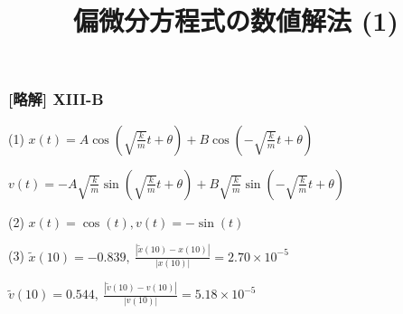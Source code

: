 \documentclass[dvipdfmx,aspectratio=169,20pt]{beamer}
\newcommand{\myfontsetting}[3]{{\fontsize{#1}{#2}\selectfont #3}}
\begin{document}
\begin{frame}
\frametitle{[略解] X\hspace{-.1em}I\hspace{-.1em}I\hspace{-.1em}I-B}
\myfontsetting{16pt}{16pt}{
(1) $x(t) = A \cos\left( \sqrt{\frac{k}{m}} t + \theta \right) + B \cos\left( - \sqrt{\frac{k}{m}} t + \theta \right) $

\hspace{8mm} $v(t) = - A \sqrt{\frac{k}{m}}\sin\left( \sqrt{\frac{k}{m}} t + \theta \right) + B \sqrt{\frac{k}{m}}\sin\left( - \sqrt{\frac{k}{m}} t + \theta \right) $

\vspace{5mm}

(2) $x(t) = \cos(t), v(t) = - \sin(t)$

\vspace{5mm}

(3) $\tilde{x}(10) = -0.839,\  \frac{|\tilde{x}(10) - x(10)|}{|x(10)|} = 2.70 \times 10^{-5}$

\hspace{8mm} $\tilde{v}(10) = 0.544,\  \frac{|\tilde{v}(10) - v(10)|}{|v(10)|} = 5.18 \times 10^{-5}$
}

\end{frame}

\title{\myfontsetting{32pt}{32pt}{偏微分方程式の数値解法 (1)}}


\end{document}
